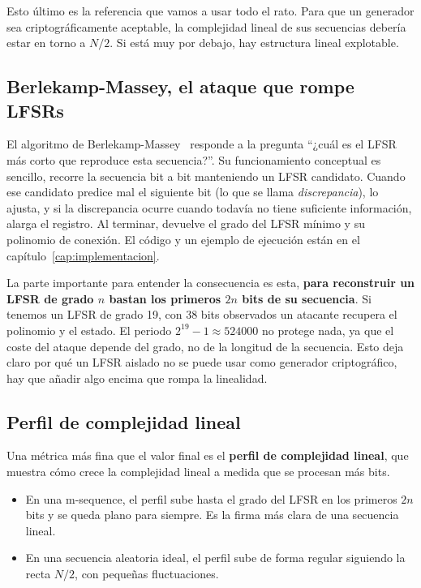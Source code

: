 Esto último es la referencia que vamos a usar todo el rato.
Para que un generador sea criptográficamente aceptable, la complejidad lineal de sus secuencias debería estar en torno a $N/2$.
Si está muy por debajo, hay estructura lineal explotable.

\subsection{Berlekamp-Massey, el ataque que rompe LFSRs}

El algoritmo de Berlekamp-Massey~\cite{massey1969} responde a la pregunta ``¿cuál es el LFSR más corto que reproduce esta secuencia?''.
Su funcionamiento conceptual es sencillo, recorre la secuencia bit a bit manteniendo un LFSR candidato.
Cuando ese candidato predice mal el siguiente bit (lo que se llama \textit{discrepancia}), lo ajusta,
y si la discrepancia ocurre cuando todavía no tiene suficiente información, alarga el registro.
Al terminar, devuelve el grado del LFSR mínimo y su polinomio de conexión.
El código y un ejemplo de ejecución están en el capítulo~\ref{cap:implementacion}.

La parte importante para entender la consecuencia es esta, \textbf{para reconstruir un LFSR de grado $n$ bastan los primeros $2n$ bits de su secuencia}.
Si tenemos un LFSR de grado 19, con 38 bits observados un atacante recupera el polinomio y el estado.
El periodo $2^{19} - 1 \approx 524000$ no protege nada, ya que el coste del ataque depende del grado, no de la longitud de la secuencia.
Esto deja claro por qué un LFSR aislado no se puede usar como generador criptográfico, hay que añadir algo encima que rompa la linealidad.

\subsection{Perfil de complejidad lineal}

Una métrica más fina que el valor final es el \textbf{perfil de complejidad lineal}, que muestra cómo crece la complejidad lineal a medida que se procesan más bits.

\begin{itemize}
  \item En una m-sequence, el perfil sube hasta el grado del LFSR en los primeros $2n$ bits y se queda plano para siempre.
        Es la firma más clara de una secuencia lineal.
  \item En una secuencia aleatoria ideal, el perfil sube de forma regular siguiendo la recta $N/2$, con pequeñas fluctuaciones.
\end{itemize}

